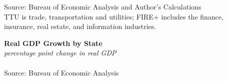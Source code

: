 \documentclass{report}
\begin{document}
\begin{minipage}{0.76\textwidth}
\footnotesize{Source: Bureau of Economic Analysis and Author's Calculations \\ TTU is trade, transportation and utilities; FIRE+ includes the finance, insurance, real estate, and information industries. }
\end{minipage}
\newpage 
\vspace{-4mm}

\noindent \normalsize \textbf{Real GDP Growth by State}\\
\footnotesize{\textit{percentage point change in real GDP}}\\
\vspace{-2mm}
\hspace{-12mm}  \\
\footnotesize{Source: Bureau of Economic Analysis}

\begin{minipage}{0.76\textwidth} 
\small  
\end{minipage}
\vspace{2mm}
\end{document}
